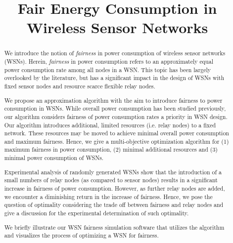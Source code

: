 \documentclass[11pt,conference]{IEEEtran}
\begin{document}
\title{Fair Energy Consumption in Wireless Sensor Networks}
\author{
\and
{}
\and
{}
}

\maketitle



\begin{abstract}
We introduce the notion of \textit{fairness} in power consumption of wireless sensor networks (WSNs). 
Herein, \textit{fairness} in power consumption refers to an approximately equal power consumption rate among all nodes in a WSN. This topic has been largely overlooked by the literature, but has a significant impact in the design of WSNs with fixed sensor nodes and resource scarce flexible relay nodes.

We propose an approximation algorithm with the aim to introduce fairness to power consumption in WSNs. While overall power consumption has been studied previously, our algorithm considers fairness of power consumption rates a priority in WSN design. Our algorithm introduces additional, limited resources (i.e. relay nodes) to a fixed network. These resources may be moved to achieve minimal overall power consumption and maximum fairness. Hence, we give a multi-objective optimization algorithm for (1) maximum fairness in power consumption, (2) minimal additional resources and (3) minimal power consumption of WSNs.

Experimental analysis of randomly generated WSNs show that the introduction of a small numbers of relay nodes (as compared to sensor nodes) results in a significant increase in fairness of power consumption. However, as further relay nodes are added, we encounter a diminishing return in the increase of fairness. Hence, we pose the question of optimality considering the trade off between fairness and relay nodes and give a discussion for the experimental determination of such optimality.

We briefly illustrate our WSN fairness simulation software that utilizes the algorithm and visualizes the process of optimizing a WSN for fairness.
\end{abstract}
\end{document}
